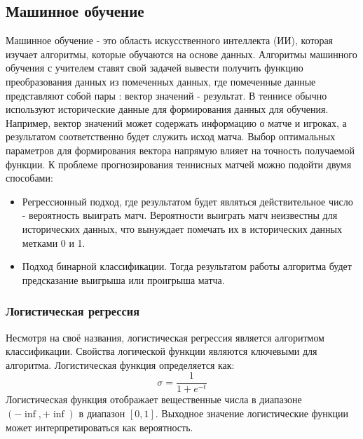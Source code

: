 \subsection{Машинное обучение}
Машинное обучение - это область искусственного интеллекта (ИИ), которая изучает алгоритмы, которые обучаются на основе данных.
Алгоритмы машинного обучения с учителем ставят свой задачей вывести получить функцию преобразования данных из помеченных данных, где помеченные данные представляют собой пары : вектор значений  - результат.
В теннисе обычно используют исторические данные для формирования данных для обучения. Например, вектор значений может содержать информацию о матче и игроках, а результатом соответственно  будет служить исход матча. Выбор оптимальных параметров для формирования вектора напрямую влияет на точность получаемой функции.
К проблеме прогнозирования теннисных матчей можно подойти двумя способами:
\begin{itemize}
	\item Регрессионный подход, где результатом будет являться действительное число - вероятность выиграть матч. Вероятности выиграть матч неизвестны для исторических данных, что вынуждает помечать их в исторических данных метками 0 и 1.
	\item Подход бинарной классификации. Тогда результатом работы алгоритма будет предсказание выигрыша или проигрыша матча.
\end{itemize}
\break
\subsubsection{Логистическая регрессия}
Несмотря на своё названия, логистическая регрессия является алгоритмом классификации. Свойства логической функции являются ключевыми для алгоритма. Логистическая функция определяется как:
\begin{equation}\label{formula3}
\sigma=\frac{1}{1 + e^{-t}}
\end{equation}
Логистическая функция отображает 
вещественные числа в диапазоне $(-\inf, +\inf)$ в диапазон $[0,1]$. Выходное значение логистические функции может интерпретироваться как вероятность.

